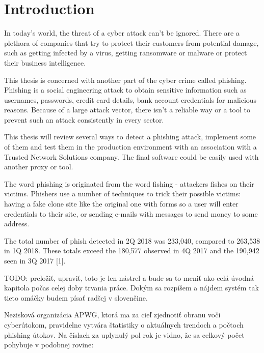 \documentclass[
  digital, %
  twoside, %
  table,   %
  nolof,     %
  nolot,     %
]{fithesis3}
\begin{document}
\chapter{Introduction}

In today's world, the threat of a cyber attack can't be ignored. There are a plethora of companies that try to protect their customers from potential damage, such as getting infected by a virus, getting ransomware or malware or protect their business intelligence.

This thesis is concerned with another part of the cyber crime called phishing. Phishing is a social engineering attack to obtain sensitive information such as usernames, passwords, credit card details, bank account credentials for malicious reasons. Because of a large attack vector, there isn't a reliable way or a tool to prevent such an attack consistently in every sector.

This thesis will review several ways to detect a phishing attack, implement some of them and test them in the production environment with an association with a Trusted Network Solutions company. The final software could be easily used with another proxy or tool.

The word phishing is originated from the word fishing - attackers fishes on their victims. Phishers use a number of techniques to trick their possible victims: having a fake clone site like the original one with forms so a user will enter credentials to their site, or sending e-mails with messages to send money to some address.

The total number of phish detected in 2Q 2018 was 233,040, compared to 263,538 in 1Q 2018. These totals exceed the 180,577 observed in 4Q 2017 and the 190,942 seen in 3Q 2017 [1].

TODO: preložiť, upraviť, toto je len nástrel a bude sa to meniť ako celá úvodná kapitola počas celej doby trvania práce. Dokým sa rozpíšem a nájdem systém tak tieto omáčky budem písať radšej v slovenčine.

Nezisková organizácia APWG, ktorá ma za cieľ zjednotiť obranu voči cyberútokom, pravidelne vytvára štatistiky o aktuálnych trendoch a počtoch phishing útokov. Na číslach za uplynulý pol rok je vidno, že sa celkový počet pohybuje v podobnej rovine:
\end{document}
